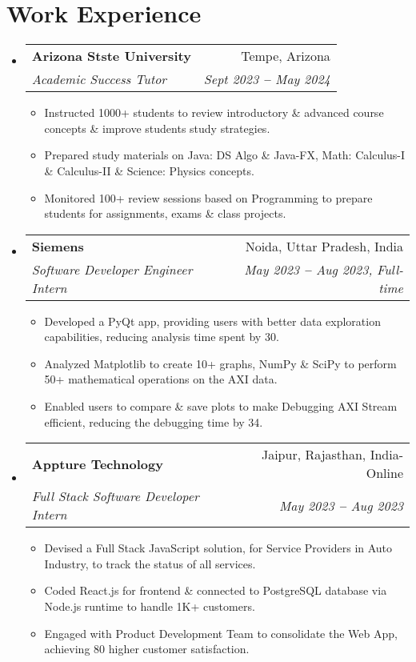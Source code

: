 \documentclass[letterpaper,11pt]{article}
\makeatletter
\newcommand{\resumeItem}[1]{
  \item\small{
    {#1 \vspace{-2pt}}
  }
}
\newcommand{\resumeSubheading}[4]{
  \vspace{-2pt}\item
    \begin{tabular*}{0.97\textwidth}[t]{l@{\extracolsep{\fill}}r}
      \textbf{#1} & #2 \\
      \textit{\small#3} & \textit{\small #4} \\
    \end{tabular*}\vspace{-7pt}
}
\newcommand{\resumeSubHeadingListStart}{\begin{itemize}[leftmargin=0.15in, label={}]}
\newcommand{\resumeSubHeadingListEnd}{\end{itemize}}
\newcommand{\resumeItemListStart}{\begin{itemize}}
\newcommand{\resumeItemListEnd}{\end{itemize}\vspace{-5pt}}
\makeatother
\begin{document}

\section{Work Experience}
  \resumeSubHeadingListStart

    \resumeSubheading
      {Arizona Stste University}{Tempe, Arizona}
      {Academic Success Tutor}{Sept 2023 \textbf{--} May 2024}
        \resumeItemListStart
            \resumeItem{Instructed 1000+ students to review introductory \& advanced course concepts \& improve students study strategies.}
            \resumeItem{Prepared study materials on Java: DS Algo \& Java-FX, Math: Calculus-I \& Calculus-II \& Science: Physics concepts.}
            \resumeItem{Monitored 100+ review sessions based on Programming to prepare students for assignments, exams \& class projects.}
        \resumeItemListEnd

    \resumeSubheading
      {Siemens}{Noida, Uttar Pradesh, India}
      {Software Developer Engineer Intern}{May 2023 \textbf{--} Aug 2023, Full-time}
        \resumeItemListStart
            \resumeItem{Developed a PyQt app, providing users with better data exploration capabilities, reducing analysis time spent by 30.}
            \resumeItem{Analyzed Matplotlib to create 10+ graphs, NumPy \& SciPy to perform 50+ mathematical operations on the AXI data.}
            \resumeItem{Enabled users to compare \& save plots to make Debugging AXI Stream efficient, reducing the debugging time by 34.}
        \resumeItemListEnd

    \resumeSubheading
      {Appture Technology}{Jaipur, Rajasthan, India- Online}
      {Full Stack Software Developer Intern}{May 2023 \textbf{--} Aug 2023}
        \resumeItemListStart
            \resumeItem{Devised a Full Stack JavaScript solution, for Service Providers in Auto Industry, to track the status of all services.}
            \resumeItem{Coded React.js for frontend \& connected to PostgreSQL database via Node.js runtime to handle 1K+ customers.}
            \resumeItem{Engaged with Product Development Team to consolidate the Web App, achieving 80 higher customer satisfaction.}
        \resumeItemListEnd
  \resumeSubHeadingListEnd

\end{document}
